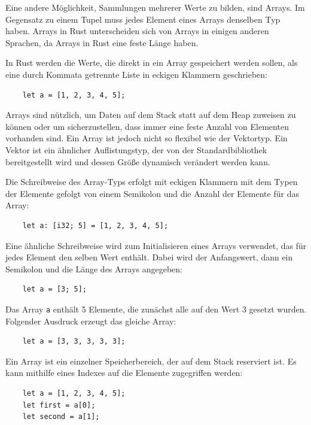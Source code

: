 Eine andere Möglichkeit, Sammlungen mehrerer Werte zu bilden, sind Arrays. Im Gegensatz zu einem Tupel muss jedes Element eines Arrays denselben Typ haben. Arrays in Rust unterscheiden sich von Arrays in einigen anderen Sprachen, da Arrays in Rust eine feste Länge haben.

In Rust werden die Werte, die direkt in ein Array gespeichert werden sollen, als eine durch Kommata getrennte Liste in eckigen Klammern geschrieben:

\begin{lstlisting}
    let a = [1, 2, 3, 4, 5];
\end{lstlisting}

Arrays sind nützlich, um Daten auf dem Stack statt auf dem Heap zuweisen zu können oder um sicherzustellen, dass immer eine feste Anzahl von Elementen vorhanden sind. Ein Array ist jedoch nicht so flexibel wie der Vektortyp. Ein Vektor ist ein ähnlicher Auflistungstyp, der von der Standardbibliothek bereitgestellt wird und dessen Größe dynamisch verändert werden kann.

Die Schreibweise des Array-Typs erfolgt mit eckigen Klammern mit dem Typen der Elemente gefolgt von einem Semikolon und die Anzahl der Elemente für das Array:

\begin{lstlisting}
    let a: [i32; 5] = [1, 2, 3, 4, 5];
\end{lstlisting}

Eine ähnliche Schreibweise wird zum Initialisieren eines Arrays verwendet, das für jedes Element den selben Wert enthält. Dabei wird der Anfangswert, dann ein Semikolon und die Länge des Arrays angegeben:

\begin{lstlisting}
    let a = [3; 5];
\end{lstlisting}

Das Array \verb"a" enthält 5 Elemente, die zunächst alle auf den Wert 3 gesetzt wurden. Folgender Ausdruck erzeugt das gleiche Array:

\begin{lstlisting}
    let a = [3, 3, 3, 3, 3];
\end{lstlisting}

Ein Array ist ein einzelner Speicherbereich, der auf dem Stack reserviert ist. Es kann mithilfe eines Indexes auf die Elemente zugegriffen werden:

\begin{lstlisting}
    let a = [1, 2, 3, 4, 5];
    let first = a[0];
    let second = a[1];
\end{lstlisting}

